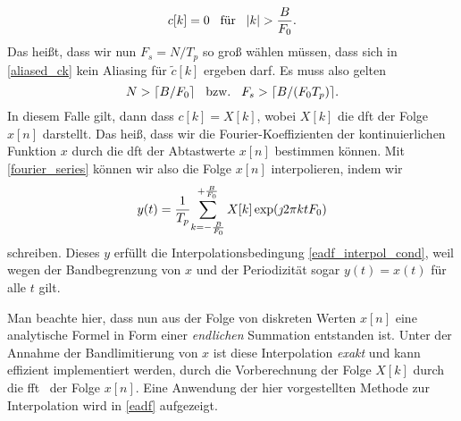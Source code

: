 \begin{equation}
    c[k] = 0 {\hspace{3mm} \text{f\"ur} \hspace{3mm}} {\left| k \right|} > \frac{B}{F_0}.
\end{equation}
Das hei{\ss}t, dass wir nun $F_s = N/T_p$ so gro{\ss} w\"ahlen m\"ussen, dass sich in \eqref{aliased_ck} kein Aliasing f\"ur $\tilde{c}[k]$ ergeben darf. Es muss also gelten
\begin{equation}
    N > \lceil B/F_0 \rceil {\hspace{3mm} \text{bzw.} \hspace{3mm}} F_s > \lceil B/(F_0 T_p) \rceil.
\end{equation}
In diesem Falle gilt, dann dass $c[k] = X[k]$, wobei $X[k]$ die \gls{dft} der Folge $x[n]$ darstellt. Das hei{\ss}, dass wir die Fourier-Koeffizienten der kontinuierlichen Funktion $x$ durch die \gls{dft} der Abtastwerte $x[n]$ bestimmen k\"onnen. Mit \eqref{fourier_series} k\"onnen wir also die Folge $x[n]$ interpolieren, indem wir
\begin{equation}\label{dft_interpolation}
    y(t) = \frac{1}{T_p}{\sum\limits_{k=-\frac{B}{F_0}}^{+\frac{B}{F_0}}{
        X[k] \exp(\jmath 2 \pi k t F_0) 
    }}
\end{equation}
schreiben. Dieses $y$ erf\"ullt die Interpolationsbedingung \eqref{eadf_interpol_cond}, weil wegen der Bandbegrenzung von $x$ und der Periodizit\"at sogar $y(t) = x(t)$ f\"ur alle $t$ gilt.

Man beachte hier, dass nun aus der Folge von diskreten Werten $x[n]$ eine analytische Formel in Form einer \emph{endlichen} Summation entstanden ist. Unter der Annahme der Bandlimitierung von $x$ ist diese Interpolation \emph{exakt} und kann effizient implementiert werden, durch die Vorberechnung der Folge $X[k]$ durch die \gls{fft}~\cite{FFTW05} der Folge $x[n]$. Eine Anwendung der hier vorgestellten Methode zur Interpolation wird in \cref{eadf} aufgezeigt.